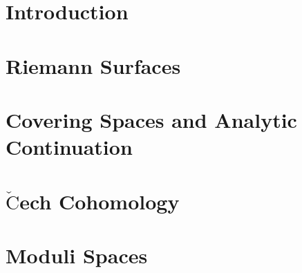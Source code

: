 \documentclass[a4paper, 8pt, notitlepage]{extreport}
\begin{document}
    

    \chapter{Introduction}\label{I}
    
    

    \chapter{Riemann Surfaces}\label{RS}
    
    

    \chapter{Covering Spaces and Analytic Continuation}\label{CS}
    
    
    

    \chapter{$\check{\textrm{C}}$ech Cohomology}\label{CC}
    
    
    

    \chapter{Moduli Spaces}\label{MS}
    
    

    
\end{document}
